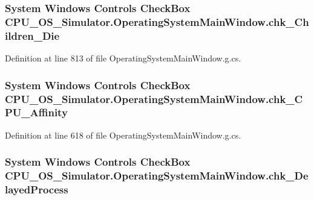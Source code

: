 \subsubsection[{chk\+\_\+\+Children\+\_\+\+Die}]{\setlength{\rightskip}{0pt plus 5cm}System Windows Controls Check\+Box C\+P\+U\+\_\+\+O\+S\+\_\+\+Simulator.\+Operating\+System\+Main\+Window.\+chk\+\_\+\+Children\+\_\+\+Die\hspace{0.3cm}{\ttfamily [package]}}\label{class_c_p_u___o_s___simulator_1_1_operating_system_main_window_a22ea0e1679c79b12e2637f93543c0bef}


Definition at line 813 of file Operating\+System\+Main\+Window.\+g.\+cs.

\hypertarget{class_c_p_u___o_s___simulator_1_1_operating_system_main_window_a5f027a391759480d1d00c76c2171c6b9}{}
\subsubsection[{chk\+\_\+\+C\+P\+U\+\_\+\+Affinity}]{\setlength{\rightskip}{0pt plus 5cm}System Windows Controls Check\+Box C\+P\+U\+\_\+\+O\+S\+\_\+\+Simulator.\+Operating\+System\+Main\+Window.\+chk\+\_\+\+C\+P\+U\+\_\+\+Affinity\hspace{0.3cm}{\ttfamily [package]}}\label{class_c_p_u___o_s___simulator_1_1_operating_system_main_window_a5f027a391759480d1d00c76c2171c6b9}


Definition at line 618 of file Operating\+System\+Main\+Window.\+g.\+cs.

\hypertarget{class_c_p_u___o_s___simulator_1_1_operating_system_main_window_aa7e58acf30f50880e309615f92f0ef8e}{}
\subsubsection[{chk\+\_\+\+Delayed\+Process}]{\setlength{\rightskip}{0pt plus 5cm}System Windows Controls Check\+Box C\+P\+U\+\_\+\+O\+S\+\_\+\+Simulator.\+Operating\+System\+Main\+Window.\+chk\+\_\+\+Delayed\+Process\hspace{0.3cm}{\ttfamily [package]}}\label{class_c_p_u___o_s___simulator_1_1_operating_system_main_window_aa7e58acf30f50880e309615f92f0ef8e}


